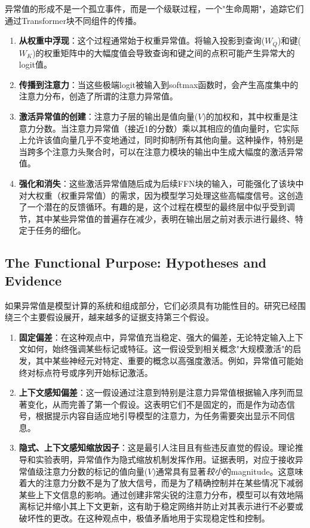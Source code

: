 \documentclass{article}
\begin{document}
异常值的形成不是一个孤立事件，而是一个级联过程，一个"生命周期"，追踪它们通过Transformer块不同组件的传播。

\begin{enumerate}
\item \textbf{从权重中浮现}：这个过程通常始于权重异常值。将输入投影到查询($W_Q$)和键($W_K$)的权重矩阵中的大幅度值会导致查询和键之间的点积可能产生异常大的logit值。
\item \textbf{传播到注意力}：当这些极端logit被输入到softmax函数时，会产生高度集中的注意力分布，创造了所谓的注意力异常值。
\item \textbf{激活异常值的创建}：注意力子层的输出是值向量($V$)的加权和，其中权重是注意力分数。当注意力异常值（接近1的分数）乘以其相应的值向量时，它实际上允许该值向量几乎不变地通过，同时抑制所有其他向量。这种操作，特别是当跨多个注意力头聚合时，可以在注意力模块的输出中生成大幅度的激活异常值。
\item \textbf{强化和消失}：这些激活异常值随后成为后续FFN块的输入，可能强化了该块中对大权重（权重异常值）的需求，因为模型学习处理这些高幅度信号。这创造了一个潜在的反馈循环。有趣的是，这个过程在模型的最终层中似乎受到调节，其中某些异常值的普遍存在减少，表明在输出层之前对表示进行最终、特定于任务的细化。
\end{enumerate}

\subsection{The Functional Purpose: Hypotheses and Evidence}

如果异常值是模型计算的系统和组成部分，它们必须具有功能性目的。研究已经围绕三个主要假设展开，越来越多的证据支持第三个假设。

\begin{enumerate}
\item \textbf{固定偏差}：在这种观点中，异常值充当稳定、强大的偏差，无论特定输入上下文如何，始终强调某些标记或特征。这一假设受到相关概念"大规模激活"的启发，其中某些神经元对特定、重要的概念以高强度激活。例如，异常值可能始终对标点符号或序列开始标记激活。
\item \textbf{上下文感知偏差}：这一假设通过注意到特别是注意力异常值根据输入序列而显著变化，从而完善了第一个假设。这表明它们不是固定的，而是作为动态信号，根据提示内容自适应地引导模型的注意力，为任务需要突出显示不同信息。
\item \textbf{隐式、上下文感知缩放因子}：这是最引人注目且有些违反直觉的假设。理论推导和实验表明，异常值作为隐式缩放机制发挥作用。证据表明，对应于接收异常值级注意力分数的标记的值向量($V$)通常具有显著\emph{较小}的magnitude。这意味着大的注意力分数不是为了放大信号，而是为了精确控制并在某些情况下减弱某些上下文信息的影响。通过创建非常尖锐的注意力分布，模型可以有效地隔离标记并缩小其上下文更新，这有助于稳定网络并防止对其表示进行不必要或破坏性的更改。在这种观点中，极值矛盾地用于实现稳定性和控制。
\end{enumerate}
\end{document}

